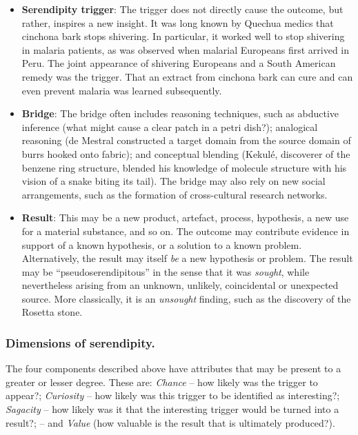 \begin{itemize}
\item \textbf{Serendipity trigger}: The trigger does not directly
  cause the outcome, but rather, inspires a new insight.  It was long
  known by Quechua medics that cinchona bark stops shivering.  In
  particular, it worked well to stop shivering in malaria patients, as
  was observed when malarial Europeans first arrived in Peru.  The
  joint appearance of shivering Europeans and a South American remedy
  was the trigger.  That an extract from cinchona bark can cure and
  can even prevent malaria was learned subsequently.
\end{itemize}

\begin{itemize}
\item \textbf{Bridge}: The bridge often includes reasoning techniques,
  such as abductive inference (what might cause a clear patch in a
  petri dish?); analogical reasoning (de Mestral constructed a target
  domain from the source domain of burrs hooked onto fabric); and
  conceptual blending (Kekul\'e, discoverer of the benzene ring
  structure, blended his knowledge of molecule structure with his
  vision of a snake biting its tail).  The bridge may also rely on new
  social arrangements, such as the formation of cross-cultural
  research networks.
\end{itemize}

\begin{itemize}
\item \textbf{Result}: This may be a new product, artefact, process,
  hypothesis, a new use for a material substance, and so on.  The
  outcome may contribute evidence in support of a known hypothesis, or
  a solution to a known problem.  Alternatively, the result may itself
  {\em be} a new hypothesis or problem.  The result may be
  ``pseudoserendipitous'' in the sense that it was {\em sought}, while
  nevertheless arising from an unknown, unlikely, coincidental or
  unexpected source.  More classically, it is an \emph{unsought}
  finding, such as the discovery of the Rosetta stone.
\end{itemize}

\subsubsection*{Dimensions of serendipity.}

The four components described above have attributes that may be present to a greater or lesser degree.  These are: \emph{Chance} -- how likely was the trigger to appear?; \emph{Curiosity} -- how likely was this trigger to be identified as interesting?; \emph{Sagacity} -- how likely was it that the interesting trigger would be turned into a result?; -- and \emph{Value} (how valuable is the result that is ultimately produced?).

